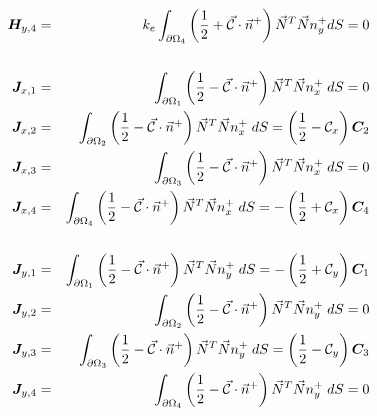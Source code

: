 \begin{eqnarray}
{\bm H}_{y,4} &=& k_e \int_{\partial\Omega_4}  \left( \frac{1}{2} + \vec{\cal C} \cdot \vec{n}^+ \right) \vec{N}^T \vec{N} n^+_y dS = 0 \nonumber\\ 
\nonumber\\
{\bm J}_{x,1} &=& \int_{\partial\Omega_1}  \left(\frac{1}{2} - \vec{\cal{C}} \cdot \vec{n}^+ \right) \vec{N}^T \vec{N} n^+_x  \; dS = 0 \nonumber\\ 
{\bm J}_{x,2} &=& \int_{\partial\Omega_2}  \left(\frac{1}{2} - \vec{\cal{C}} \cdot \vec{n}^+ \right) \vec{N}^T \vec{N} n^+_x  \; dS = \left(\frac{1}{2} - {\cal C}_x \right) {\bm C}_{2} \nonumber\\
{\bm J}_{x,3} &=& \int_{\partial\Omega_3}  \left(\frac{1}{2} - \vec{\cal{C}} \cdot \vec{n}^+ \right) \vec{N}^T \vec{N} n^+_x  \; dS = 0 \nonumber\\
{\bm J}_{x,4} &=& \int_{\partial\Omega_4}  \left(\frac{1}{2} - \vec{\cal{C}} \cdot \vec{n}^+ \right) \vec{N}^T \vec{N} n^+_x  \; dS = -\left(\frac{1}{2} + {\cal C}_x \right) {\bm C}_{4} \nonumber\\
\nonumber\\
{\bm J}_{y,1} &=& \int_{\partial\Omega_1}  \left(\frac{1}{2} - \vec{\cal{C}} \cdot \vec{n}^+ \right) \vec{N}^T \vec{N} n^+_y  \; dS = - \left(\frac{1}{2} + {\cal C}_y \right) {\bm C}_{1} \nonumber\\
{\bm J}_{y,2} &=& \int_{\partial\Omega_2}  \left(\frac{1}{2} - \vec{\cal{C}} \cdot \vec{n}^+ \right) \vec{N}^T \vec{N} n^+_y  \; dS = 0 \nonumber\\
{\bm J}_{y,3} &=& \int_{\partial\Omega_3}  \left(\frac{1}{2} - \vec{\cal{C}} \cdot \vec{n}^+ \right) \vec{N}^T \vec{N} n^+_y  \; dS =   \left(\frac{1}{2} - {\cal C}_y \right) {\bm C}_{3} \nonumber\\
{\bm J}_{y,4} &=& \int_{\partial\Omega_4}  \left(\frac{1}{2} - \vec{\cal{C}} \cdot \vec{n}^+ \right) \vec{N}^T \vec{N} n^+_y  \; dS = 0 \nonumber
\end{eqnarray}














